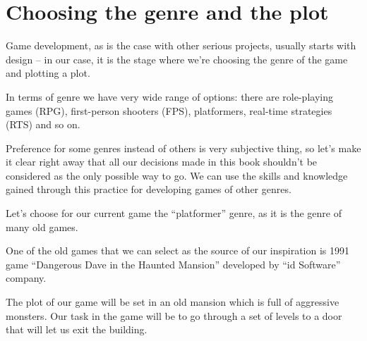 \documentclass[../sparc.tex]{subfiles}
\begin{document}
\section{Choosing the genre and the plot}

Game development, as is the case with other serious projects, usually starts
with design -- in our case, it is the stage where we're choosing the genre of the
game and plotting a plot.

In terms of genre we have very wide range of options: there are role-playing
games (RPG), first-person shooters (FPS), platformers, real-time strategies
(RTS) and so on.

Preference for some genres instead of others is very subjective thing, so let's
make it clear right away that all our decisions made in this book shouldn't be
considered as the only possible way to go.  We can use the skills and knowledge
gained through this practice for developing games of other genres.

Let's choose for our current game the ``platformer'' genre, as it is the genre
of many old games.

One of the old games that we can select as the source of our inspiration is 1991
game ``Dangerous Dave in the Haunted Mansion'' developed by ``id Software''
company.

The plot of our game will be set in an old mansion which is full of aggressive
monsters.  Our task in the game will be to go through a set of levels to a door
that will let us exit the building.
\end{document}
